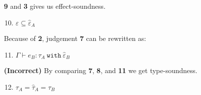 \documentclass{llncs}
\newcommand{\keywadj}[1]{\mathtt{#1}}
\newcommand{\keyw}[1]{\keywadj{#1}~}
\newcommand{\type}[2]{
	#1~\keyw{with} #2
}
\begin{document}
{\noindent
\textbf{9} and \textbf{3} gives us effect-soundness.

\begin{adjustwidth}{1.5em}{0em}
\begin{enumerate}
	\setcounter{enumi}{9}
	\item $\varepsilon \subseteq \hat \varepsilon_A$ \\
\end{enumerate}
\end{adjustwidth}


\noindent
Because of \textbf{2}, judgement \textbf{7} can be rewritten as:

\begin{adjustwidth}{1.5em}{0em}
\begin{enumerate}
	\setcounter{enumi}{10}
	\item $\Gamma \vdash \hat e_B : \type{\tau_A}{\hat \varepsilon_B}$ \\
\end{enumerate}
\end{adjustwidth}

\noindent
\textbf{(Incorrect)} By comparing \textbf{7}, \textbf{8}, and \textbf{11} we get type-soundness.

\begin{adjustwidth}{1.5em}{0em}
\begin{enumerate}
	\setcounter{enumi}{11}
	\item $\tau_A = \hat \tau_A = \tau_B$
\end{enumerate}
\end{adjustwidth}
}
\end{document}
